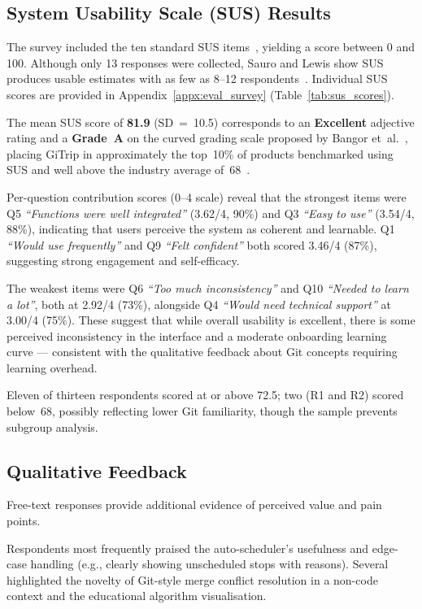 \subsection{System Usability Scale (SUS) Results}
The survey included the ten standard SUS items~\cite{ref_brooke_sus}, yielding a score between 0 and 100. Although only 13 responses were collected, Sauro and Lewis show SUS produces usable estimates with as few as 8--12 respondents~\cite{ref_sauro_lewis_sus}. Individual SUS scores are
provided in Appendix~\ref{appx:eval_survey} (Table~\ref{tab:sus_scores}).

The mean SUS score of \textbf{81.9} (SD~=~10.5) corresponds to an
\textbf{Excellent} adjective rating and a \textbf{Grade~A} on the curved grading
scale proposed by Bangor et~al.~\cite{ref_bangor_sus}, placing GiTrip in
approximately the top~10\% of products benchmarked using SUS and well above the
industry average of~68~\cite{ref_sauro_lewis_sus}.

Per-question contribution scores (0--4 scale) reveal that the strongest items
were Q5 \textit{``Functions were well integrated''} (3.62/4, 90\%) and Q3
\textit{``Easy to use''} (3.54/4, 88\%), indicating that users perceive the
system as coherent and learnable. Q1 \textit{``Would use frequently''} and Q9
\textit{``Felt confident''} both scored 3.46/4 (87\%), suggesting strong
engagement and self-efficacy.

The weakest items were Q6 \textit{``Too much inconsistency''} and Q10
\textit{``Needed to learn a lot''}, both at 2.92/4 (73\%), alongside Q4
\textit{``Would need technical support''} at 3.00/4 (75\%). These suggest that
while overall usability is excellent, there is some perceived inconsistency in
the interface and a moderate onboarding learning curve --- consistent with the
qualitative feedback about Git concepts requiring learning overhead.

Eleven of thirteen respondents scored at or above 72.5; two (R1 and R2) scored below~68, possibly reflecting lower Git familiarity, though the sample prevents subgroup analysis.

\subsection{Qualitative Feedback}
Free-text responses provide additional evidence of perceived value and pain
points.

Respondents most frequently praised the auto-scheduler's usefulness and edge-case handling (e.g., clearly showing unscheduled stops with reasons). Several highlighted the novelty of Git-style merge conflict resolution in a non-code context and the educational algorithm visualisation.

